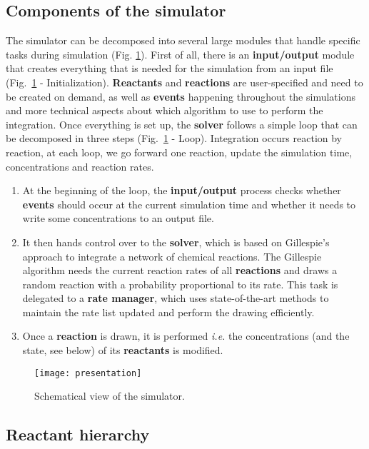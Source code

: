 \graphicspath{{\relativepath/figures/}}

\subsection{Components of the simulator}

The simulator can be decomposed into several large modules that handle specific tasks during simulation (Fig. \ref{presentation}). First of all, there is an \textbf{input/output} module that creates everything that is needed for the simulation from an input file (Fig.~\ref{presentation} - Initialization). \textbf{Reactants} and \textbf{reactions} are user-specified and need to be created on demand, as well as \textbf{events} happening throughout the simulations and more technical aspects about which algorithm to use to perform the integration. Once everything is set up, the \textbf{solver} follows a simple loop that can be decomposed in three steps (Fig.~\ref{presentation} - Loop). Integration occurs reaction by reaction, at each loop, we go forward one reaction, update the simulation time, concentrations and reaction rates.

\begin{enumerate}
	\item At the beginning of the loop, the \textbf{input/output} process checks whether \textbf{events} should occur at the current simulation time and whether it needs to write some concentrations to an output file.
	\item It then hands control over to the \textbf{solver}, which is based on Gillespie's approach to integrate a network of chemical reactions. The Gillespie algorithm needs the current reaction rates of all \textbf{reactions} and draws a random reaction with a probability proportional to its rate. This task is delegated to a \textbf{rate manager}, which uses state-of-the-art methods to maintain the rate list updated and perform the drawing efficiently.
	\item Once a \textbf{reaction} is drawn, it is performed \textit{i.e.} the concentrations (and the state, see below) of its \textbf{reactants} is modified.
\end{enumerate}

\begin{figure}[!ht]
	\centering
	\texttt{[image: presentation]}
	\caption{Schematical view of the simulator.}
	\label{presentation}
\end{figure}


\subsection{Reactant hierarchy}

